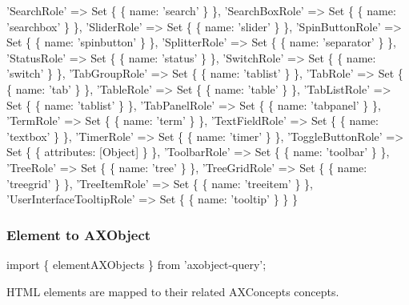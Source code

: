 \begin{DoxyCode}
  'SearchRole' => Set \{ \{ name: 'search' \} \},
  'SearchBoxRole' => Set \{ \{ name: 'searchbox' \} \},
  'SliderRole' => Set \{ \{ name: 'slider' \} \},
  'SpinButtonRole' => Set \{ \{ name: 'spinbutton' \} \},
  'SplitterRole' => Set \{ \{ name: 'separator' \} \},
  'StatusRole' => Set \{ \{ name: 'status' \} \},
  'SwitchRole' => Set \{ \{ name: 'switch' \} \},
  'TabGroupRole' => Set \{ \{ name: 'tablist' \} \},
  'TabRole' => Set \{ \{ name: 'tab' \} \},
  'TableRole' => Set \{ \{ name: 'table' \} \},
  'TabListRole' => Set \{ \{ name: 'tablist' \} \},
  'TabPanelRole' => Set \{ \{ name: 'tabpanel' \} \},
  'TermRole' => Set \{ \{ name: 'term' \} \},
  'TextFieldRole' => Set \{ \{ name: 'textbox' \} \},
  'TimerRole' => Set \{ \{ name: 'timer' \} \},
  'ToggleButtonRole' => Set \{ \{ attributes: [Object] \} \},
  'ToolbarRole' => Set \{ \{ name: 'toolbar' \} \},
  'TreeRole' => Set \{ \{ name: 'tree' \} \},
  'TreeGridRole' => Set \{ \{ name: 'treegrid' \} \},
  'TreeItemRole' => Set \{ \{ name: 'treeitem' \} \},
  'UserInterfaceTooltipRole' => Set \{ \{ name: 'tooltip' \} \}
\}
\end{DoxyCode}


\subsubsection*{Element to A\+X\+Object}


\begin{DoxyCode}
import \{ elementAXObjects \} from 'axobject-query';
\end{DoxyCode}


H\+T\+ML elements are mapped to their related A\+X\+Concepts concepts.


